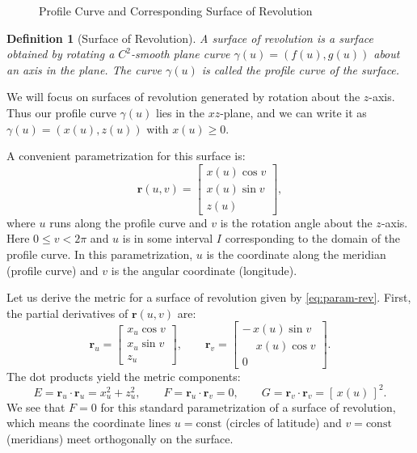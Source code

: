 \documentclass[12pt]{article}
\newtheorem{definition}{Definition}[section]
\begin{document}
\begin{figure}[ht]
	\caption{Profile Curve and Corresponding Surface of Revolution}
\end{figure}

\begin{definition}[Surface of Revolution]\label{def:surf-rev}
A surface of revolution is a surface obtained by rotating a $C^{2}$-smooth plane curve $\gamma(u) = (f(u), g(u))$ about an axis in the plane. 
The curve $\gamma(u)$ is called the \emph{profile curve} of the surface. 
\end{definition}
We will focus on surfaces of revolution generated by rotation about the $z$-axis.
Thus our profile curve $\gamma(u)$ lies in the $xz$-plane, and we can write it as $\gamma(u) = (x(u), z(u))$ with $x(u)\ge 0$.

A convenient parametrization for this surface is:
\begin{equation}\label{eq:param-rev}
\mathbf{r}(u,v) = \begin{bmatrix}
x(u)\cos v\\[1ex]
x(u)\sin v\\[1ex]
z(u)
\end{bmatrix}, 
\end{equation}
where $u$ runs along the profile curve and $v$ is the rotation angle about the $z$-axis. 
Here $0 \le v < 2\pi$ and $u$ is in some interval $I$ corresponding to the domain of the profile curve. 
In this parametrization, $u$ is the coordinate along the meridian (profile curve) and $v$ is the angular coordinate (longitude).

Let us derive the metric for a surface of revolution given by \eqref{eq:param-rev}. 
First, the partial derivatives of $\mathbf{r}(u,v)$ are:
\[
\mathbf{r}_u = \begin{bmatrix} x_{u}\cos v \\ x_{u}\sin v \\ z_{u} \end{bmatrix}, \qquad 
\mathbf{r}_v = \begin{bmatrix} -\,x(u)\sin v \\ \phantom{-}x(u)\cos v \\ 0 \end{bmatrix}.
\]
The dot products yield the metric components:
\[
E = \mathbf{r}_u \cdot \mathbf{r}_u = x_{u}^{2} + z_{u}^{2}, \qquad 
F = \mathbf{r}_u \cdot \mathbf{r}_v = 0, \qquad 
G = \mathbf{r}_v \cdot \mathbf{r}_v = [\,x(u)\,]^{2}.
\]
We see that $F=0$ for this standard parametrization of a surface of revolution, which means the coordinate lines $u=\text{const}$ (circles of latitude) and $v=\text{const}$ (meridians) meet orthogonally on the surface. 
\end{document}
